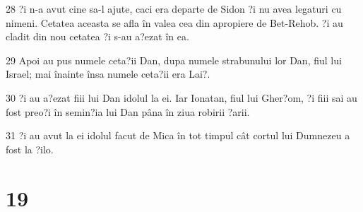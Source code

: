 \par 28 ?i n-a avut cine sa-l ajute, caci era departe de Sidon ?i nu avea legaturi cu nimeni. Cetatea aceasta se afla în valea cea din apropiere de Bet-Rehob. ?i au cladit din nou cetatea ?i s-au a?ezat în ea.
\par 29 Apoi au pus numele ceta?ii Dan, dupa numele strabunului lor Dan, fiul lui Israel; mai înainte însa numele ceta?ii era Lai?.
\par 30 ?i au a?ezat fiii lui Dan idolul la ei. Iar Ionatan, fiul lui Gher?om, ?i fiii sai au fost preo?i în semin?ia lui Dan pâna în ziua robirii ?arii.
\par 31 ?i au avut la ei idolul facut de Mica în tot timpul cât cortul lui Dumnezeu a fost la ?ilo.

\chapter{19}

